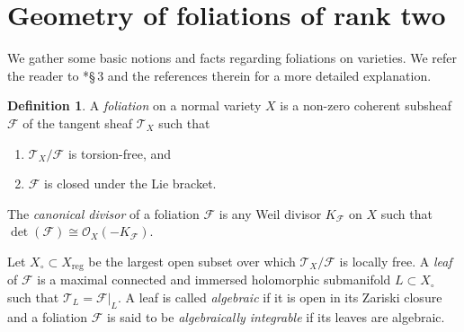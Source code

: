 \documentclass[12pt,twoside]{amsart}
\DeclareMathOperator{\reg}{reg}
\theoremstyle{definition}
\newtheorem{defn}[thm]{Definition}
\begin{document}
\section{Geometry of foliations of rank two}\label{sec.foliation}

We gather some basic notions and facts regarding foliations on varieties. We refer the reader to \cite{druel}*{\S\,3} and the references therein for a more detailed explanation. 

\begin{defn}
    A {\it foliation} on a normal variety $X$ is a non-zero coherent subsheaf $\mathcal{F}$ of the tangent sheaf $\mathcal{T}_X$ such that 
    \begin{enumerate}
	\item $\mathcal{T}_X/\mathcal{F}$ is torsion-free, and	
	\item $\mathcal{F}$ is closed under the Lie bracket.
    \end{enumerate} 
    The {\it canonical divisor} of a foliation $\mathcal{F}$ is any Weil divisor $K_{\mathcal{F}}$ on $X$ such that $\det(\mathcal{F})\cong \mathcal{O}_X(-K_{\mathcal{F}})$. 
 
    Let $X_{\circ}\subset X_{\reg}$ be the largest open subset over which $\mathcal{T}_X/\mathcal{F}$ is locally free. A \emph{leaf} of $\mathcal{F}$ is a maximal connected and immersed holomorphic submanifold $L\subset X_{\circ}$ such that $\mathcal{T}_L=\mathcal{F}|_L$. A leaf is called \emph{algebraic} if it is open in its Zariski closure and a foliation $\mathcal{F}$ is said to be \emph{algebraically integrable} if its leaves are algebraic. 
\end{defn}
\end{document}
